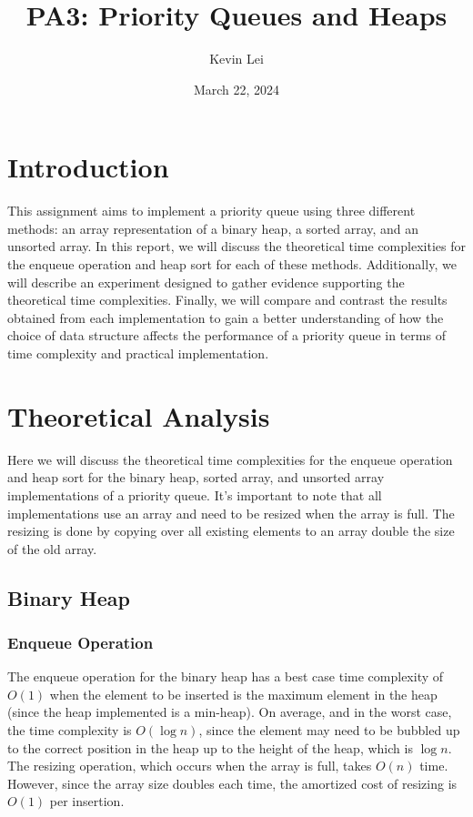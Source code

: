 \documentclass{article}
\title{PA3: Priority Queues and Heaps}
\author{Kevin Lei}
\date{March 22, 2024}
\begin{document}
\maketitle

\section{Introduction}
This assignment aims to implement a priority queue using three different methods: an array representation of a binary heap, a sorted array, and an unsorted array. 
In this report, we will discuss the theoretical time complexities for the enqueue operation and heap sort for each of these methods. 
Additionally, we will describe an experiment designed to gather evidence supporting the theoretical time complexities. 
Finally, we will compare and contrast the results obtained from each implementation to gain a better understanding of how the choice of data structure affects the performance of a priority queue in terms of time complexity and practical implementation.

\section{Theoretical Analysis}
Here we will discuss the theoretical time complexities for the enqueue operation and heap sort for the binary heap, sorted array, and unsorted array implementations of a priority queue. 
It's important to note that all implementations use an array and need to be resized when the array is full. 
The resizing is done by copying over all existing elements to an array double the size of the old array.

\subsection{Binary Heap}
\subsubsection{Enqueue Operation}
The enqueue operation for the binary heap has a best case time complexity of $O(1)$ when the element to be inserted is the maximum element in the heap (since the heap implemented is a min-heap). 
On average, and in the worst case, the time complexity is $O(\log n)$, since the element may need to be bubbled up to the correct position in the heap up to the height of the heap, which is $\log n$. 
The resizing operation, which occurs when the array is full, takes $O(n)$ time. 
However, since the array size doubles each time, the amortized cost of resizing is $O(1)$ per insertion.
\end{document}
